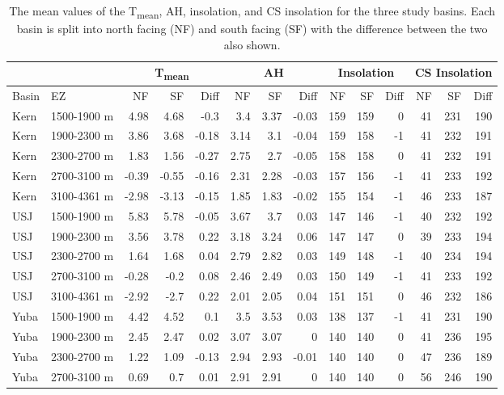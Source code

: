 \begin{table}[htbp]
\centering
\caption{The mean values of the T\textsubscript{mean}, AH, insolation, and CS insolation for the three study basins. Each basin is split into north facing (NF) and south facing (SF) with the difference between the two also shown.}
\label{tab:met_metric_table}
\tiny 
\begin{tabular}{llrrrrrrrrrrrr}
\toprule
& & \multicolumn{3}{c}{T\textsubscript{mean}} & \multicolumn{3}{c}{AH} & \multicolumn{3}{c}{Insolation} & \multicolumn{3}{c}{CS Insolation} \\
\midrule
Basin & EZ & NF & SF & Diff & NF & SF & Diff & NF & SF & Diff & NF & SF & Diff \\
\midrule
Kern & 1500-1900 m & 4.98 & 4.68 & -0.3 & 3.4 & 3.37 & -0.03 & 159 & 159 & 0 & 41 & 231 & 190 \\
Kern & 1900-2300 m & 3.86 & 3.68 & -0.18 & 3.14 & 3.1 & -0.04 & 159 & 158 & -1 & 41 & 232 & 191 \\
Kern & 2300-2700 m & 1.83 & 1.56 & -0.27 & 2.75 & 2.7 & -0.05 & 158 & 158 & 0 & 41 & 232 & 191 \\
Kern & 2700-3100 m & -0.39 & -0.55 & -0.16 & 2.31 & 2.28 & -0.03 & 157 & 156 & -1 & 41 & 233 & 192 \\
Kern & 3100-4361 m & -2.98 & -3.13 & -0.15 & 1.85 & 1.83 & -0.02 & 155 & 154 & -1 & 46 & 233 & 187 \\
USJ & 1500-1900 m & 5.83 & 5.78 & -0.05 & 3.67 & 3.7 & 0.03 & 147 & 146 & -1 & 40 & 232 & 192 \\
USJ & 1900-2300 m & 3.56 & 3.78 & 0.22 & 3.18 & 3.24 & 0.06 & 147 & 147 & 0 & 39 & 233 & 194 \\
USJ & 2300-2700 m & 1.64 & 1.68 & 0.04 & 2.79 & 2.82 & 0.03 & 149 & 148 & -1 & 40 & 234 & 194 \\
USJ & 2700-3100 m & -0.28 & -0.2 & 0.08 & 2.46 & 2.49 & 0.03 & 150 & 149 & -1 & 41 & 233 & 192 \\
USJ & 3100-4361 m & -2.92 & -2.7 & 0.22 & 2.01 & 2.05 & 0.04 & 151 & 151 & 0 & 46 & 232 & 186 \\
Yuba & 1500-1900 m & 4.42 & 4.52 & 0.1 & 3.5 & 3.53 & 0.03 & 138 & 137 & -1 & 41 & 231 & 190 \\
Yuba & 1900-2300 m & 2.45 & 2.47 & 0.02 & 3.07 & 3.07 & 0 & 140 & 140 & 0 & 41 & 236 & 195 \\
Yuba & 2300-2700 m & 1.22 & 1.09 & -0.13 & 2.94 & 2.93 & -0.01 & 140 & 140 & 0 & 47 & 236 & 189 \\
Yuba & 2700-3100 m & 0.69 & 0.7 & 0.01 & 2.91 & 2.91 & 0 & 140 & 140 & 0 & 56 & 246 & 190 \\
\bottomrule
\end{tabular}
\end{table}

